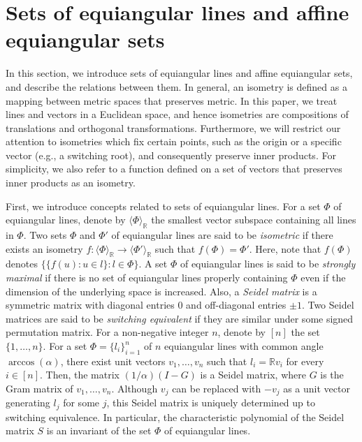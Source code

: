 \documentclass[reqno, 11pt]{amsart}
\numberwithin{equation}{section}
\theoremstyle{definition}
\newcommand{\R}{\mathbb{R}}
\begin{document}
\section{Sets of equiangular lines and affine equiangular sets}	\label{sec:aes}
In this section, we introduce sets of equiangular lines and affine equiangular sets, and describe the relations between them.
In general, an isometry is defined as a mapping between metric spaces that preserves metric.
In this paper, we treat lines and vectors in  a Euclidean space, and hence isometries are compositions of translations and orthogonal transformations.
Furthermore, we will restrict our attention to isometries which fix certain points, such as the origin or a specific vector (e.g., a switching root), and consequently preserve inner products.
For simplicity, we also refer to a function defined on a set of vectors that preserves inner products as an isometry.

First, we introduce concepts related to sets of equiangular lines.
For a set $\Phi$ of equiangular lines, denote by $\langle \Phi \rangle_{\R}$ the smallest vector subspace containing all lines in $\Phi$.
Two sets $\Phi$ and $\Phi'$ of equiangular lines are said to be \emph{isometric} if there exists an isometry $f : \langle \Phi \rangle_{\R} \to \langle \Phi' \rangle_{\R}$ such that $f(\Phi) = \Phi'$.
Here, note that $f(\Phi)$ denotes $\{ \{ f(u) : u \in l \} : l \in \Phi \}$.
A set $\Phi$ of equiangular lines is said to be \emph{strongly maximal} if there is no set of equiangular lines properly containing $\Phi$ even if the dimension of the underlying space is increased.
Also, a \emph{Seidel matrix} is a symmetric matrix with diagonal entries $0$ and off-diagonal entries $\pm 1$.
Two Seidel matrices are said to be \emph{switching equivalent} if they are similar under some signed permutation matrix.
For a non-negative integer $n$, denote by $[n]$ the set $\{ 1, \ldots, n \}$.
For a set $\Phi = \{ l_i \}_{i=1}^n$ of $n$ equiangular lines with common angle $\arccos(\alpha)$, there exist unit vectors $v_1, \ldots, v_n$ such that $l_i = \R v_i$ for every $i \in [n]$.
Then, the matrix $(1/\alpha)( I- G )$ is a Seidel matrix, where $G$ is the Gram matrix of $v_1, \ldots, v_n$.
Although $v_j$ can be replaced with $-v_j$ as a unit vector generating $l_j$ for some $j$, this Seidel matrix is uniquely determined up to switching equivalence.
In particular, the characteristic polynomial of the Seidel matrix $S$ is an invariant of the set $\Phi$ of equiangular lines.
\end{document}
